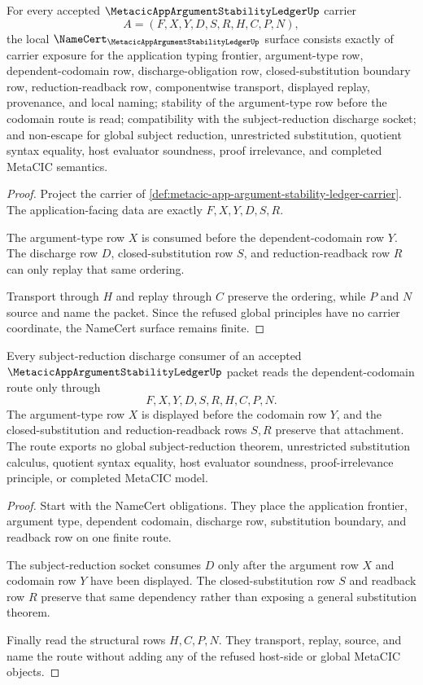\begin{theorem}
\label{thm:metacic-app-argument-stability-ledger-namecert-obligations}
For every accepted $\MetacicAppArgumentStabilityLedgerUp$ carrier
$$
A=(F,X,Y,D,S,R,H,C,P,N),
$$
the local $\NameCert_{\MetacicAppArgumentStabilityLedgerUp}$ surface consists exactly of carrier exposure for the application typing frontier, argument-type row, dependent-codomain row, discharge-obligation row, closed-substitution boundary row, reduction-readback row, componentwise transport, displayed replay, provenance, and local naming; stability of the argument-type row before the codomain route is read; compatibility with the subject-reduction discharge socket; and non-escape for global subject reduction, unrestricted substitution, quotient syntax equality, host evaluator soundness, proof irrelevance, and completed MetaCIC semantics.
\end{theorem}
\begin{proof}
Project the carrier of \autoref{def:metacic-app-argument-stability-ledger-carrier}. The application-facing data are exactly $F,X,Y,D,S,R$.

The argument-type row $X$ is consumed before the dependent-codomain row $Y$. The discharge row $D$, closed-substitution row $S$, and reduction-readback row $R$ can only replay that same ordering.

Transport through $H$ and replay through $C$ preserve the ordering, while $P$ and $N$ source and name the packet. Since the refused global principles have no carrier coordinate, the NameCert surface remains finite.
\end{proof}

\begin{theorem}
\label{thm:metacic-app-argument-stability-ledger-dependent-codomain-route}
Every subject-reduction discharge consumer of an accepted $\MetacicAppArgumentStabilityLedgerUp$ packet reads the dependent-codomain route only through
$$
F,X,Y,D,S,R,H,C,P,N .
$$
The argument-type row $X$ is displayed before the codomain row $Y$, and the closed-substitution and reduction-readback rows $S,R$ preserve that attachment. The route exports no global subject-reduction theorem, unrestricted substitution calculus, quotient syntax equality, host evaluator soundness, proof-irrelevance principle, or completed MetaCIC model.
\end{theorem}
\begin{proof}
Start with the NameCert obligations. They place the application frontier, argument type, dependent codomain, discharge row, substitution boundary, and readback row on one finite route.

The subject-reduction socket consumes $D$ only after the argument row $X$ and codomain row $Y$ have been displayed. The closed-substitution row $S$ and readback row $R$ preserve that same dependency rather than exposing a general substitution theorem.

Finally read the structural rows $H,C,P,N$. They transport, replay, source, and name the route without adding any of the refused host-side or global MetaCIC objects.
\end{proof}


